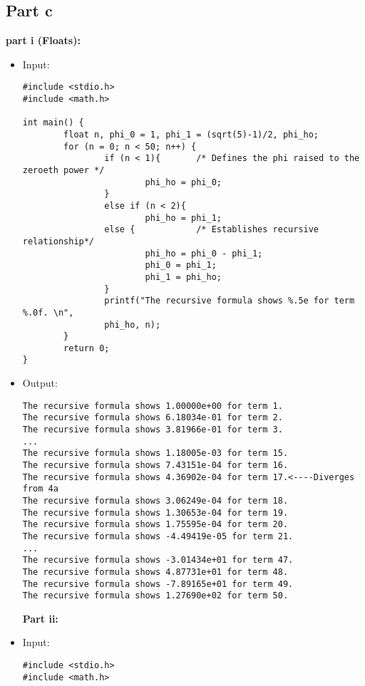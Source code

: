 \documentclass[10pt]{article}
\begin{document}
\subsection{Part c}
\textbf{part i (Floats):}
\begin{itemize}
 \item Input:
\begin{verbatim}
#include <stdio.h>
#include <math.h>

int main() {
        float n, phi_0 = 1, phi_1 = (sqrt(5)-1)/2, phi_ho; 
        for (n = 0; n < 50; n++) {
                if (n < 1){       /* Defines the phi raised to the zeroeth power */
                        phi_ho = phi_0;
                }
                else if (n < 2){
                        phi_ho = phi_1;
                else {            /* Establishes recursive relationship*/
                        phi_ho = phi_0 - phi_1;   
                        phi_0 = phi_1;
                        phi_1 = phi_ho;
                }
                printf("The recursive formula shows %.5e for term %.0f. \n", 
                phi_ho, n);
        }
        return 0;
}
\end{verbatim}
\item Output:
\begin{verbatim}
The recursive formula shows 1.00000e+00 for term 1. 
The recursive formula shows 6.18034e-01 for term 2. 
The recursive formula shows 3.81966e-01 for term 3.  
...
The recursive formula shows 1.18005e-03 for term 15. 
The recursive formula shows 7.43151e-04 for term 16. 
The recursive formula shows 4.36902e-04 for term 17.<----Diverges from 4a
The recursive formula shows 3.06249e-04 for term 18. 
The recursive formula shows 1.30653e-04 for term 19. 
The recursive formula shows 1.75595e-04 for term 20. 
The recursive formula shows -4.49419e-05 for term 21. 
...
The recursive formula shows -3.01434e+01 for term 47. 
The recursive formula shows 4.87731e+01 for term 48. 
The recursive formula shows -7.89165e+01 for term 49. 
The recursive formula shows 1.27690e+02 for term 50.  
\end{verbatim}
\textbf{Part ii:}
\item Input:
\begin{verbatim}
#include <stdio.h>
#include <math.h>


\end{verbatim}
\end{itemize}
\end{document}
